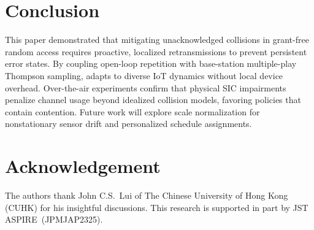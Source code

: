 \documentclass[conference]{IEEEtran}
\begin{document}
\section{Conclusion}
\label{sec:conclusion}

  This paper demonstrated that mitigating unacknowledged collisions in grant-free random access requires proactive, localized retransmissions to prevent persistent error states.
  By coupling open-loop repetition with base-station multiple-play Thompson sampling, \tool adapts to diverse IoT dynamics without local device overhead.
  Over-the-air experiments confirm that physical SIC impairments penalize channel usage beyond idealized collision models, favoring policies that contain contention.
  Future work will explore scale normalization for nonstationary sensor drift and personalized schedule assignments.

\section*{Acknowledgement}

  The authors thank John C.S.\ Lui of The Chinese University of Hong Kong (CUHK) for his insightful discussions.
  This research is supported in part by JST ASPIRE~(JPMJAP2325).

\printbibliography
\end{document}

